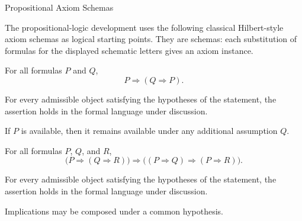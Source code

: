 \begin{topicbox}{Propositional Axiom Schemas}
\begin{exposition}
The propositional-logic development uses the following classical Hilbert-style
axiom schemas as logical starting points. They are schemas: each substitution
of formulas for the displayed schematic letters gives an axiom instance.
\end{exposition}
\end{topicbox}

\begin{axiombox}{}
\begin{axiom}
\label{ax:propositional-weakening}
For all formulas $P$ and $Q$,
\[
P \Longrightarrow (Q \Longrightarrow P).
\]
\end{axiom}
\end{axiombox}
\begin{remark*}
For every admissible object satisfying the hypotheses of the statement, the
assertion holds in the formal language under discussion.
\end{remark*}


\begin{remark*}[Interpretation]
If $P$ is available, then it remains available under any additional
assumption $Q$.
\end{remark*}

\NoLocalDependencies

\begin{axiombox}{}
\begin{axiom}
\label{ax:propositional-implication-distribution}
For all formulas $P$, $Q$, and $R$,
\[
\bigl(P \Longrightarrow (Q \Longrightarrow R)\bigr)
\Longrightarrow
\bigl((P \Longrightarrow Q) \Longrightarrow (P \Longrightarrow R)\bigr).
\]
\end{axiom}
\end{axiombox}
\begin{remark*}
For every admissible object satisfying the hypotheses of the statement, the
assertion holds in the formal language under discussion.
\end{remark*}


\begin{remark*}[Interpretation]
Implications may be composed under a common hypothesis.
\end{remark*}

